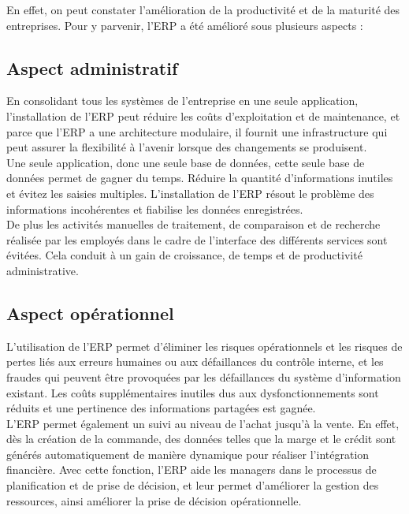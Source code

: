 En effet, on peut constater l'amélioration de la productivité et de la maturité des entreprises. Pour y parvenir, l'\acs{ERP} a été amélioré sous plusieurs aspects : \\

\subsection{Aspect administratif}
En consolidant tous les systèmes de l'entreprise en une seule application, l'installation de l'\acs{ERP} peut réduire les coûts d'exploitation et de maintenance, et parce que l'\acs{ERP} a une architecture modulaire, il fournit une infrastructure qui peut assurer la flexibilité à l'avenir lorsque des changements se produisent.\\

Une seule application, donc une seule base de données, cette seule base de données permet de gagner du temps. Réduire la quantité d'informations inutiles et évitez les saisies multiples. L'installation de l'\acs{ERP} résout le problème des informations incohérentes et fiabilise les données enregistrées.\\

De plus les activités manuelles de traitement, de comparaison et de recherche réalisée par les employés dans le cadre de l'interface des différents services sont évitées. Cela conduit à un gain de croissance, de temps et de productivité administrative.\\ 

\subsection{Aspect opérationnel}
L'utilisation de l'\acs{ERP} permet d'éliminer les risques opérationnels et les risques de pertes liés aux erreurs humaines ou aux défaillances du contrôle interne, et les fraudes qui peuvent être provoquées par les défaillances du système d'information existant. Les coûts supplémentaires inutiles dus aux dysfonctionnements sont réduits et une pertinence des informations partagées est gagnée.\\

L'\acs{ERP} permet également un suivi au niveau de l'achat jusqu'à la vente. En effet, dès la création de la commande, des données telles que la marge et le crédit sont générés automatiquement de manière dynamique pour réaliser l'intégration financière. Avec cette fonction, l'\acs{ERP} aide les managers dans le processus de planification et de prise de décision, et leur permet d'améliorer la gestion des ressources, ainsi améliorer la prise de décision opérationnelle.\\

